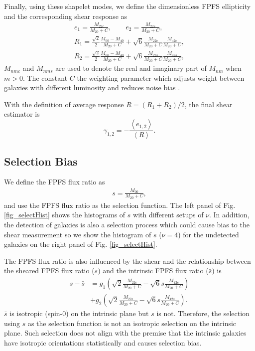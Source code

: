 \documentclass[a4paper,fleqn,usenatbib]{mnras}
\begin{document}
Finally, using these shapelet modes, we define the dimensionless FPFS
ellipticity and the corresponding shear response as
\begin{align}\label{ellipticity_define}
e_1=\frac{M_{22c}}{M_{20}+C},\qquad
e_2=\frac{M_{22s}}{M_{20}+C},\\
R_{1}=\frac{\sqrt{2}}{2}\frac{M_{00}-M_{40}}{M_{20}+C}
    +\sqrt{6}\frac{M_{22c}}{M_{20}+C}\frac{M_{42c}}{M_{20}+C},\\
R_{2}=\frac{\sqrt{2}}{2}\frac{M_{00}-M_{40}}{M_{20}+C}
    +\sqrt{6}\frac{M_{22s}}{M_{20}+C}\frac{M_{42s}}{M_{20}+C},
\end{align}
$M_{nmc}$ and $M_{nms}$ are used to denote the real and imaginary part of
$M_{nm}$ when $m>0$. The constant $C$ the weighting parameter which adjusts
weight between galaxies with different luminosity and reduces noise bias
\citep{Li18FPFS}.

With the definition of average response $R= (R_1+R_2)/2$, the final shear
estimator is
\begin{equation}
\gamma_{1,2} =-\frac{\left\langle e_{1,2}
\right\rangle}{\left\langle R \right\rangle}.
\end{equation}

\subsection{Selection Bias}
\label{sec:Method-select}

We define the FPFS flux ratio as
\begin{align}\label{select_define}
s = \frac{M_{00}}{M_{20}+C},
\end{align}
and use the FPFS flux ratio as the selection function.
The left panel of Fig. \ref{fig_selectHist} shows the histograms of $s$ with
different setups of $\nu$. In addition, the detection of galaxies is also a
selection process which could cause bias to the shear measurement so we show
the histogram of $s$ ($\nu=4$) for the undetected galaxies on the right panel
of Fig. \ref{fig_selectHist}.

The FPFS flux ratio is also influenced by the shear and the relationship
between the sheared FPFS flux ratio ($s$) and the intrinsic FPFS flux ratio
($\bar{s}$) is
\begin{align}\label{select_transform}
s-\bar{s} &=g_1 (\sqrt{2}\frac{M_{22c}}{M_{20}+C}
    -\sqrt{6}s\frac{M_{42c}}{M_{20}+C}) \\
    &+g_2 (\sqrt{2}\frac{M_{22s}}{M_{20}+C}
    -\sqrt{6}s\frac{M_{42s}}{M_{20}+C}).
\end{align}
$\bar{s}$ is isotropic (spin-0) on the intrinsic plane but $s$ is not.
Therefore, the selection using $s$ as the selection function is not an
isotropic selection on the intrinsic plane. Such selection does not align with
the premise that the intrinsic galaxies have isotropic orientations
statistically and causes selection bias.
\end{document}
